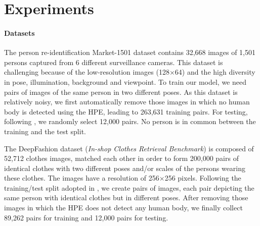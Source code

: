 \documentclass[10pt,twocolumn,letterpaper]{article}
\begin{document}
 \section{Experiments}
\label{Experiments}

\paragraph{Datasets}

The person re-identification  Market-1501 dataset \cite{zheng2015scalable} contains 32,668 images of 1,501 persons captured from 6 different surveillance cameras. This dataset is challenging because of the low-resolution images (128$\times$64) and the high diversity in pose, illumination, background and viewpoint. To train our model, we need pairs of images of the same person in two different poses. As this dataset is relatively noisy, we first automatically remove those images in which no human body is detected using the HPE, leading to 263,631 training pairs.
For testing, following  \cite{ma2017pose}, we  randomly select 12,000 pairs. No person is in common between the training and the test split.
 
The DeepFashion dataset ({\em In-shop Clothes Retrieval Benchmark}) \cite{liu2016deepfashion} is composed of 52,712 clothes images, matched each other in order to form  200,000 pairs of identical clothes with two different poses and/or scales of the persons wearing these clothes. 
The images have a resolution of 256$\times$256 pixels. 
Following the training/test split adopted in \cite{ma2017pose}, we create pairs of images, each pair depicting the same person with identical clothes  but in different poses.
After removing those images in which the HPE does not detect any human body, we finally 
 collect 89,262 pairs for training and 12,000 pairs for testing.
\end{document}
